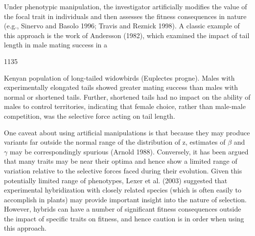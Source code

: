 \documentclass{article}
\begin{document}
Under phenotypic manipulation, the investigator artificially modifies the value of the focal trait in individuals and then assesses the fitness consequences in nature (e.g., Sinervo and Basolo 1996; Travis and Reznick 1998). A classic example of this approach is the work of Andersson (1982), which examined the impact of tail length in male mating success in a

1135

Kenyan population of long-tailed widowbirds (Euplectes progne). Males with experimentally elongated tails showed greater mating success than males with normal or shortened tails. Further, shortened tails had no impact on the ability of males to control territories, indicating that female choice, rather than male-male competition, was the selective force acting on tail length.

One caveat about using artificial manipulations is that because they may produce variants far outside the normal range of the distribution of z, estimates of  $ \beta $ and  $ \gamma $ may be correspondingly spurious (Arnold 1988). Conversely, it has been argued that many traits may be near their optima and hence show a limited range of variation relative to the selective forces faced during their evolution. Given this potentially limited range of phenotypes, Lexer et al. (2003) suggested that experimental hybridization with closely related species (which is often easily to accomplish in plants) may provide important insight into the nature of selection. However, hybrids can have a number of significant fitness consequences outside the impact of specific traits on fitness, and hence caution is in order when using this approach.
\end{document}
